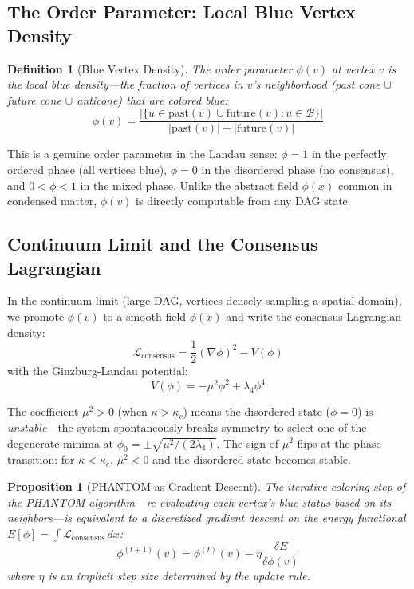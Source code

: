\documentclass[12pt,a4paper,twocolumn]{article}
\newtheorem{proposition}[theorem]{Proposition}
\newtheorem{definition}{Definition}
\newcommand{\Lconsensus}{\mathcal{L}_{\mathrm{consensus}}}
\newcommand{\kparam}{\kappa}
\begin{document}
\subsection{The Order Parameter: Local Blue Vertex Density}

\begin{definition}[Blue Vertex Density]
\label{def:order_param}
The order parameter $\phi(v)$ at vertex $v$ is the \emph{local blue density}---the fraction of vertices in $v$'s neighborhood (past cone $\cup$ future cone $\cup$ anticone) that are colored blue:
\begin{equation}
\phi(v) = \frac{|\{u \in \mathrm{past}(v) \cup \mathrm{future}(v) : u \in \mathcal{B}\}|}{|\mathrm{past}(v)| + |\mathrm{future}(v)|}
\end{equation}
\end{definition}

This is a genuine order parameter in the Landau sense: $\phi = 1$ in the perfectly ordered phase (all vertices blue), $\phi = 0$ in the disordered phase (no consensus), and $0 < \phi < 1$ in the mixed phase. Unlike the abstract field $\phi(x)$ common in condensed matter, $\phi(v)$ is directly computable from any DAG state.

\subsection{Continuum Limit and the Consensus Lagrangian}

In the continuum limit (large DAG, vertices densely sampling a spatial domain), we promote $\phi(v)$ to a smooth field $\phi(x)$ and write the consensus Lagrangian density:
\begin{equation}
\Lconsensus = \frac{1}{2}(\nabla \phi)^2 - V(\phi)
\end{equation}
with the Ginzburg-Landau potential:
\begin{equation}
V(\phi) = -\mu^2 \phi^2 + \lambda_4 \phi^4
\end{equation}

The coefficient $\mu^2 > 0$ (when $\kparam > \kparam_c$) means the disordered state ($\phi = 0$) is \emph{unstable}---the system spontaneously breaks symmetry to select one of the degenerate minima at $\phi_0 = \pm\sqrt{\mu^2 / (2\lambda_4)}$. The sign of $\mu^2$ flips at the phase transition: for $\kparam < \kparam_c$, $\mu^2 < 0$ and the disordered state becomes stable.

\begin{proposition}[PHANTOM as Gradient Descent]
The iterative coloring step of the PHANTOM algorithm---re-evaluating each vertex's blue status based on its neighbors---is equivalent to a discretized gradient descent on the energy functional $E[\phi] = \int \Lconsensus \, dx$:
\begin{equation}
\phi^{(t+1)}(v) = \phi^{(t)}(v) - \eta \frac{\delta E}{\delta \phi(v)}
\end{equation}
where $\eta$ is an implicit step size determined by the update rule.
\end{proposition}
\end{document}
